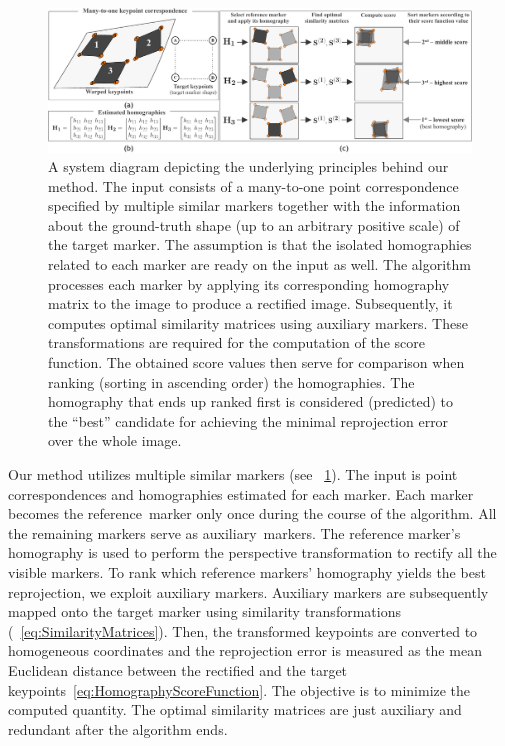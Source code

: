 \begin{figure}[t]
    \centerline{\includegraphics[width=\linewidth]{figures/homography/system_diagram.pdf}}
    \caption[Homography ranking system diagram]{A system diagram depicting the underlying principles behind our method.  The input consists of a many-to-one point correspondence specified by multiple similar markers together with the information about the ground-truth shape (up to an arbitrary positive scale) of the target marker.  The assumption is that the isolated homographies related to each marker are ready on the input as well.  The algorithm processes each marker by applying its corresponding homography matrix to the image to produce a rectified image. Subsequently, it computes optimal similarity matrices using auxiliary markers. These transformations are required for the computation of the score function. The obtained score values then serve for comparison when ranking (sorting in ascending order) the homographies. The homography that ends up ranked first is considered (predicted) to the ``best'' candidate for achieving the minimal reprojection error over the whole image.}
    \label{fig:HomographySystemDiagram}
\end{figure}

Our method utilizes multiple similar markers (see \figtext{}~\ref{fig:HomographySystemDiagram}). The input is point correspondences and homographies estimated for each marker. Each marker becomes the \mbox{reference marker} only once during the course of the algorithm. All the remaining markers serve as \mbox{auxiliary markers}. The reference marker's homography is used to perform the perspective transformation to rectify all the visible markers. To rank which reference markers' homography yields the best reprojection, we exploit auxiliary markers. Auxiliary markers are subsequently mapped onto the target marker using similarity transformations (\eqtext{}~\ref{eq:SimilarityMatrices}). Then, the transformed keypoints are converted to homogeneous coordinates and the reprojection error is measured as the mean Euclidean distance between the rectified and the target keypoints~\ref{eq:HomographyScoreFunction}. The objective is to minimize the computed quantity. The optimal similarity matrices are just auxiliary and redundant after the algorithm ends.


